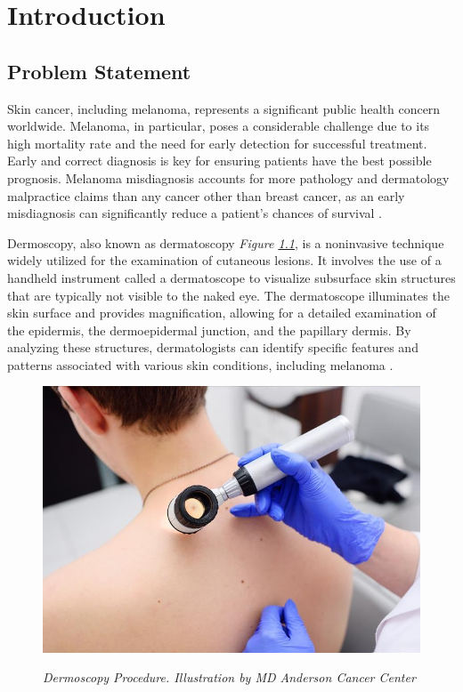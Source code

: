 \chapter{Introduction}
\label{cap:intro}

\section{Problem Statement}

Skin cancer, including melanoma, represents a significant public health concern
worldwide. Melanoma, in particular, poses a considerable challenge due to its
high mortality rate and the need for early detection for successful treatment.
Early and correct diagnosis is key for ensuring patients have the best possible
prognosis. Melanoma misdiagnosis accounts for more pathology and dermatology
malpractice claims than any cancer other than breast cancer, as an early
misdiagnosis can significantly reduce a patient’s chances of survival
\cite{Melanoma}. \newline

Dermoscopy, also known as dermatoscopy \textit{Figure
\ref{fig:procedure_dermoscopy}}, is a noninvasive technique widely utilized for
the examination of cutaneous lesions. It involves the use of a handheld
instrument called a dermatoscope to visualize subsurface skin structures that
are typically not visible to the naked eye. The dermatoscope illuminates the
skin surface and provides magnification, allowing for a detailed examination of
the epidermis, the dermoepidermal junction, and the papillary dermis. By
analyzing these structures, dermatologists can identify specific features and
patterns associated with various skin conditions, including melanoma
\cite{Dermoscopy}.

\begin{figure}[htb] \centering
  \includegraphics[width=6.5 cm]{imatges/introduction/medical_procedure_dermastocopy.jpeg}
  \caption[Dermoscopy Procedure]{\textit{Dermoscopy Procedure. Illustration by MD Anderson Cancer Center}}
  {\label{fig:procedure_dermoscopy}}
\end{figure}

